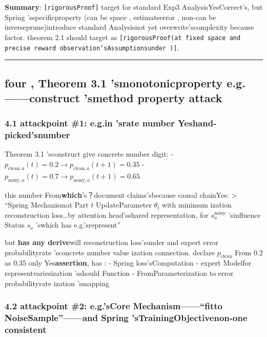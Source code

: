 \documentclass[
  12pt,
]{article}
\begin{document}
\textbf{Summary}: \texttt{{[}rigorousProof{]}} target for standard  Exp3 AnalysisYesCorrect's, but 
Spring
'sspecificproperty (can be space , estimateerror , non-can be inverseprune)introduce standard Analysisnot yet overwrite'scomplexity because factor. theorem 
2.1 should target as 
\texttt{{[}rigorousProof(at fixed space and precise reward observation'sAssumptionsunder ){]}}. 

\begin{center}\rule{0.5\linewidth}{0.5pt}\end{center}

\subsection{four , Theorem 3.1
'smonotonicproperty e.g.------construct 'smethod property attack}\label{ux56dbtheorem-3.1-ux7684ux5355ux8c03ux6027ux53cdux4f8bux6784ux9020ux7684ux5408ux6cd5ux6027ux653bux51fb}

\subsubsection{4.1 attackpoint 
\#1: e.g.in 'srate number Yeshand-picked'snumber }\label{ux653bux51fbux70b9-1ux53cdux4f8bux4e2dux7684ux6982ux7387ux6570ux5b57ux662fux624bux9009ux7684ux5e7bux6570}

Theorem 3.1 'sconstruct give concrete number digit:  -
\(p_{\text{clean},a}(t) = 0.2 \to p_{\text{clean},a}(t+1) = 0.35\) -
\(p_{\text{noisy},a}(t) = 0.7 \to p_{\text{noisy},a}(t+1) = 0.65\)

this number From\textbf{which}'s？document claims'sbecause causal chainYes:  \textgreater{}
``Spring Mechanismat Part \(t\) UpdateParameter \(\theta_t\)
with minimum ization reconstruction loss\ldots by attention head'sshared representation, for 
\(s_a^{\text{noisy}}\) 'sinfluence Status \(s_a\) 'swhich has e.g.'srepresent''

but \textbf{has any derive}will reconstruction loss'sunder and expert error probabilityrate 'sconcrete number value ization connection. declare
\(p_{\text{clean}}\) From 0.2 as  0.35 only Yes\textbf{assertion}, has :  - Spring
loss'sComputation - expert Modelfor representvariesization 'sshould Function -
FromParameterization to error probabilityrate ization 'smapping

\subsubsection{4.2 attackpoint 
\#2: e.g.'sCore Mechanism------``fitto NoiseSample''------and  Spring
'sTrainingObjectivenon-one consistent}\label{ux653bux51fbux70b9-2ux53cdux4f8bux7684ux6838ux5fc3ux673aux5236ux8fc7ux62dfux5408ux5230ux566aux58f0ux6837ux672cux4e0e-spring-ux7684ux8badux7ec3ux76eeux6807ux4e0dux4e00ux81f4}
\end{document}
